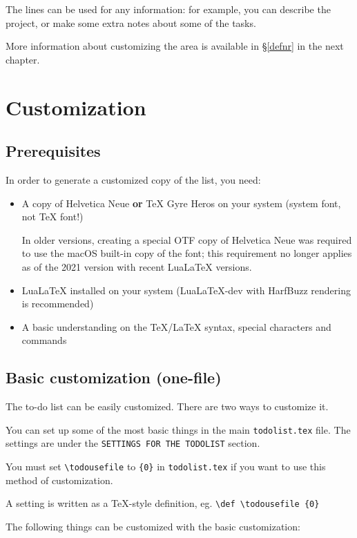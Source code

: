 \documentclass[a4paper,english]{report}
\numberwithin{equation}{section}
\newcommand{\ltcs}[1]{\texttt{\textbackslash#1}}
\begin{document}
The lines can be used for any information: for example, you can describe the project, or make some extra notes about some of the tasks.

More information about customizing the area is available in §\ref{defnr} in the next chapter.

\chapter{Customization}
\label{customization}
\section{Prerequisites}

In order to generate a customized copy of the list, you need:

\begin{itemize}
\item A copy of Helvetica Neue \textbf{or} \TeX{} Gyre Heros on your system (system font, not \TeX{} font!)

In older versions, creating a special OTF copy of Helvetica Neue was required to use the macOS built-in copy of the font; this requirement no longer applies as of the 2021 version with recent LuaLaTeX versions.

\item Lua\LaTeX{} installed on your system (LuaLaTeX-dev with HarfBuzz rendering is recommended)
\item A basic understanding on the \TeX{}/\LaTeX{} syntax, special characters and commands
\end{itemize}

\section{Basic customization (one-file)}
\label{basic}

The to-do list can be easily customized.  There are two ways to customize it.

You can set up some of the most basic things in the main \texttt{todolist.tex} file.  The settings are under the \texttt{SETTINGS FOR THE TODOLIST} section.

You must set \ltcs{todousefile} to \texttt{\{0\}} in \texttt{todolist.tex} if you want to use this method of customization.

A setting is written as a \TeX-style definition, eg. \texttt{\ltcs{def} \ltcs{todousefile} \{0\}}

The following things can be customized with the basic customization:
\end{document}
